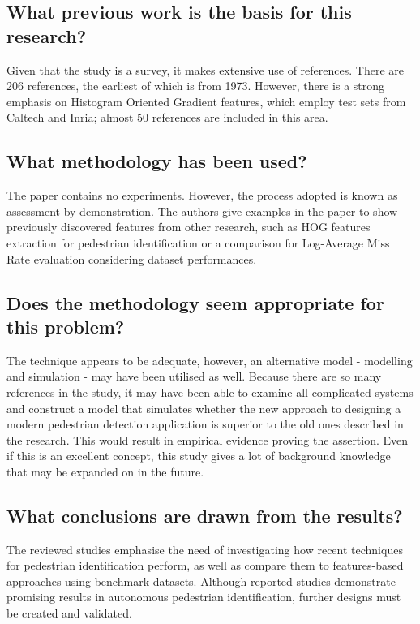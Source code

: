 \documentclass[11pt,a4paper]{article}
\begin{document}
\subsection*{What previous work is the basis for this research?}
Given that the study is a survey, it makes extensive use of references. There are 206 references, the earliest of which is from 1973. However, there is a strong emphasis on Histogram Oriented Gradient features, which employ test sets from Caltech and Inria; almost 50 references are included in this area.

\subsection*{What methodology has been used?}
The paper contains no experiments. However, the process adopted is known as assessment by demonstration. The authors give examples in the paper to show previously discovered features from other research, such as HOG features extraction for pedestrian identification or a comparison for Log-Average Miss Rate evaluation considering dataset performances.

\subsection*{Does the methodology seem appropriate for this problem?}
The technique appears to be adequate, however, an alternative model - modelling and simulation - may have been utilised as well. Because there are so many references in the study, it may have been able to examine all complicated systems and construct a model that simulates whether the new approach to designing a modern pedestrian detection application is superior to the old ones described in the research. This would result in empirical evidence proving the assertion. Even if this is an excellent concept, this study gives a lot of background knowledge that may be expanded on in the future.

\subsection*{What conclusions are drawn from the results?}
The reviewed studies emphasise the need of investigating how recent techniques for pedestrian identification perform, as well as compare them to features-based approaches using benchmark datasets. Although reported studies demonstrate promising results in autonomous pedestrian identification, further designs must be created and validated.
\end{document}
